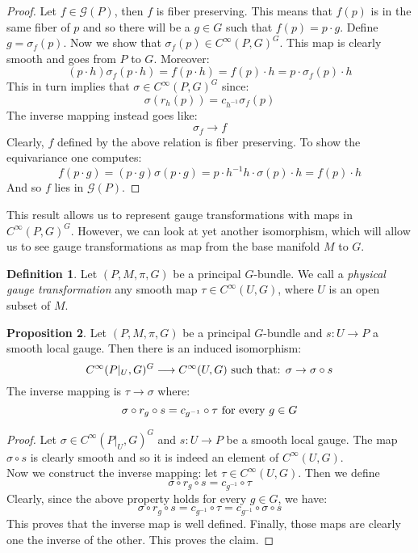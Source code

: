 \documentclass[12pt,a4paper]{report}
\theoremstyle{definition}
\newtheorem{Def}{Definition}[chapter]
\theoremstyle{Theorem}
\newtheorem{Prop}[Def]{Proposition}
\theoremstyle{definition}
\theoremstyle{definition}
\begin{document}
	\begin{proof}
		Let $f\in\mathcal{G}(P)$, then $f$ is fiber preserving. This means that $f(p)$ is in the same fiber of $p$ and so there will be a $g\in G$ such that $f(p)=p\cdot g$. Define $g=\sigma_f(p)$. Now we show that $\sigma_f(p)\in C^\infty(P,G)^G$. This map is clearly smooth and goes from $P$ to $G$. Moreover:
		$$(p\cdot h)\sigma_f(p\cdot h)=f(p\cdot h)=f(p)\cdot h=p\cdot \sigma_f(p)\cdot h$$
		This in turn implies that $\sigma\in C^\infty(P,G)^G$ since:
		$$\sigma(r_h(p))=c_{h^{-1}}\sigma_f(p)$$
		The inverse mapping instead goes like:
		$$\sigma_f\rightarrow f$$
		Clearly, $f$ defined by the above relation is fiber preserving. To show the equivariance one computes:
		$$f(p\cdot g)=(p\cdot g)\sigma(p\cdot g)=p\cdot h^{-1}h\cdot\sigma(p)\cdot h=f(p)\cdot h$$
		And so $f$ lies in $\mathcal{G}(P)$.
	\end{proof}
	This result allows us to represent gauge transformations with maps in $C^\infty(P,G)^G$. However, we can look at yet another isomorphism, which will allow us to see gauge transformations as map from the base manifold $M$ to $G$.
	\begin{Def}
		Let $(P,M,\pi,G)$ be a principal $G$-bundle. We call a \textit{physical gauge transformation} any smooth map $\tau\in C^\infty(U,G)$, where $U$ is an open subset of $M$.
	\end{Def} 
	\begin{Prop}\label{Prop_7.1.2}
		Let $(P,M,\pi,G)$ be a principal $G$-bundle and $s:U\rightarrow P$ a smooth local gauge. Then there is an induced isomorphism:
		$$C^\infty(P|_U,G)^G\longrightarrow C^\infty(U,G)\hbox{ such that: }\sigma\rightarrow \sigma\circ s$$
		The inverse mapping is $\tau\rightarrow \sigma$ where: 
		$$\sigma\circ r_g\circ s=c_{g^{-1}}\circ\tau\hbox{ for every } g\in G$$
	\end{Prop}
	\begin{proof}
		Let $\sigma\in C^\infty(P|_U,G)^G$ and $s:U\rightarrow P$ be a smooth local gauge. The map $\sigma\circ s$ is clearly smooth and so it is indeed an element of $C^\infty(U,G)$.\\
		Now we construct the inverse mapping: let $\tau\in C^\infty(U,G)$. Then we define 
		$$\sigma\circ r_g\circ s=c_{g^{-1}}\circ\tau$$
		Clearly, since the above property holds for every $g\in G$, we have:
		$$\sigma\circ r_g\circ s=c_{g^{-1}}\circ \tau=c_{g^{-1}}\circ \sigma\circ s$$
		This proves that the inverse map is well defined. Finally, those maps are clearly one the inverse of the other. This proves the claim.
	\end{proof}
\end{document}
